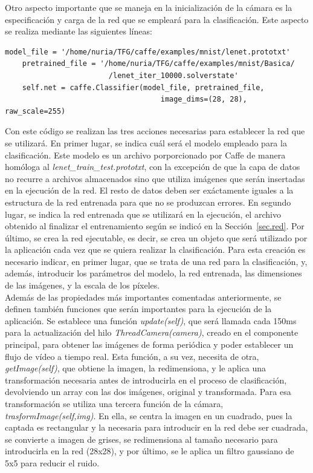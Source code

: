 Otro aspecto importante que se maneja en la inicialización de la cámara es la especificación y carga de la red que se empleará para la clasificación. Este aspecto se realiza mediante las siguientes líneas:
\vspace{10pt}
\begin{lstlisting}[frame=single]
	model_file = '/home/nuria/TFG/caffe/examples/mnist/lenet.prototxt'
	pretrained_file = '/home/nuria/TFG/caffe/examples/mnist/Basica/
						/lenet_iter_10000.solverstate'
	self.net = caffe.Classifier(model_file, pretrained_file, 
									image_dims=(28, 28), raw_scale=255)
\end{lstlisting}

Con este código se realizan las tres acciones necesarias para establecer la red que se utilizará. En primer lugar, se indica cuál será el modelo empleado para la clasificación. Este modelo es un archivo porporcionado por Caffe de manera homóloga al \textit{lenet\_train\_test.prototxt}, con la excepción de que la capa de datos no recurre a archivos almacenados sino que utiliza imágenes que serán insertadas en la ejecución de la red. El resto de datos deben ser exáctamente iguales a la estructura de la red entrenada para que no se produzcan errores. En segundo lugar, se indica la red entrenada que se utilizará en la ejecución, el archivo obtenido al finalizar el entrenamiento según se indicó en la Sección~\ref{sec.red}. Por último, se crea la red ejecutable, es decir, se crea un objeto que será utilizado por la aplicación cada vez que se quiera realizar la clasificación. Para esta creación es necesario indicar, en primer lugar, que se trata de una red para la clasificación, y, además, introducir los parámetros del modelo, la red entrenada, las dimensiones de las imágenes, y la escala de los píxeles.\\

Además de las propiedades más importantes comentadas anteriormente, se definen también funciones que serán importantes para la ejecución de la aplicación. Se establece una función \textit{update(self)}, que será llamada cada 150ms para la actualización del hilo \textit{ThreadCamera(camera)}, creado en el componente principal, para obtener las imágenes de forma periódica y poder establecer un flujo de vídeo a tiempo real. Esta función, a su vez, necesita de otra, \textit{getImage(self)}, que obtiene la imagen, la redimensiona, y le aplica una transformación necesaria antes de introducirla en el proceso de clasificación, devolviendo un array con las dos imágenes, original y transformada. Para esa transformación se utiliza una tercera función de la cámara, \textit{trasformImage(self,img)}. En ella, se centra la imagen en un cuadrado, pues la captada es rectangular y la necesaria para introducir en la red debe ser cuadrada, se convierte a imagen de grises, se redimensiona al tamaño necesario para introducirla en la red (28x28), y por último, se le aplica un filtro gaussiano de 5x5 para reducir el ruido.\\

